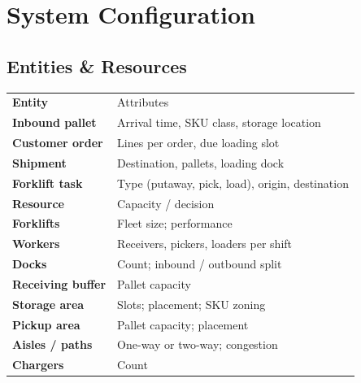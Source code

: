\documentclass[10pt]{selfArx}
\begin{document}
\section{System Configuration}

\subsection*{Entities \& Resources}
{\small
\renewcommand{\arraystretch}{1.15}
\setlength{\tabcolsep}{3pt}
\noindent\begin{tabularx}{\columnwidth}{>{\bfseries}P{2.4cm}L}
 Entity & Attributes \\
Inbound pallet  & Arrival time, SKU class, storage location \\
Customer order  & Lines per order, due loading slot \\
Shipment        & Destination, pallets, loading dock \\
Forklift task   & Type (putaway, pick, load), origin, destination \\
 Resource & Capacity / decision \\
Forklifts         & Fleet size; performance \\
Workers           & Receivers, pickers, loaders per shift \\
Docks             & Count; inbound / outbound split \\
Receiving buffer  & Pallet capacity \\
Storage area      & Slots; placement; SKU zoning \\
Pickup area       & Pallet capacity; placement \\
Aisles / paths    & One-way or two-way; congestion \\
Chargers          & Count \\
\end{tabularx}}
\end{document}
